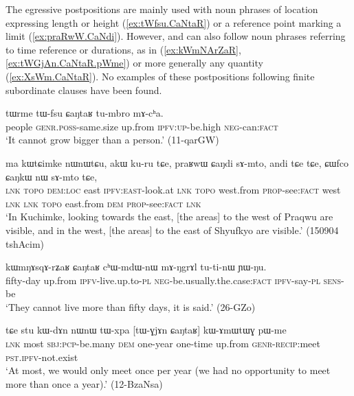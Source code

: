 The egressive postpositions are mainly used with noun phrases of location expressing length or height (\ref{ex:tWfsu.CaNtaR}) or a reference point marking a limit (\ref{ex:praRwW.CaNdi}). However,  and  can also follow noun phrases referring to time reference or durations, as in (\ref{ex:kWmNArZaR}, \ref{ex:tWGjAn.CaNtaR.pWme}) or more generally any quantity (\ref{ex:XsWm.CaNtaR}). No examples of these postpositions following finite subordinate clauses have been found.


\begin{exe}
\ex \label{ex:tWfsu.CaNtaR}
 \gll tɯrme tɯ-fsu ɕaŋtaʁ tu-mbro mɤ-cʰa. \\
people \textsc{genr}.\textsc{poss}-same.size up.from \textsc{ipfv}:\textsc{up}-be.high \textsc{neg}-can:\textsc{fact} \\
\glt `It cannot grow bigger than a person.' (11-qarGW)
\end{exe}
 
\begin{exe}
\ex \label{ex:praRwW.CaNdi}
 \gll ma kɯtɕimke nɯnɯtɕu, akɯ ku-ru tɕe, praʁwɯ ɕaŋdi sɤ-mto, 
andi tɕe tɕe, ɕɯfco ɕaŋkɯ nɯ sɤ-mto tɕe, \\
\textsc{lnk}  \textsc{topo} \textsc{dem}:\textsc{loc} east \textsc{ipfv}:\textsc{east}-look.at \textsc{lnk}  \textsc{topo} west.from \textsc{prop}-see:\textsc{fact} west \textsc{lnk} \textsc{lnk}  \textsc{topo} east.from \textsc{dem} \textsc{prop}-see:\textsc{fact} \textsc{lnk} \\
\glt `In Kuchimke, looking towards the east, [the areas] to the west of Praqwu are visible, and in the west, [the areas] to the east of Shyufkyo are visible.' (150904 tshAcim)
\end{exe}

\begin{exe}
\ex \label{ex:kWmNArZaR}
 \gll kɯmŋɤsqɤ-rʑaʁ ɕaŋtaʁ cʰɯ-mdɯ-nɯ mɤ-ŋgrɤl tu-ti-nɯ ɲɯ-ŋu.  \\
 fifty-day up.from \textsc{ipfv}-live.up.to-\textsc{pl} \textsc{neg}-be.usually.the.case:\textsc{fact} \textsc{ipfv}-say-\textsc{pl} \textsc{sens}-be \\
\glt `They cannot live more than fifty days, it is said.' (26-GZo) 
\end{exe}

\begin{exe}
\ex \label{ex:tWGjAn.CaNtaR.pWme}
 \gll tɕe stu kɯ-dɤn nɯnɯ tɯ-xpa [tɯ-ɣjɤn ɕaŋtaʁ] kɯ-ɤmɯtɯɣ pɯ-me \\
 \textsc{lnk} most \textsc{sbj}:\textsc{pcp}-be.many \textsc{dem} one-year one-time up.from \textsc{genr}-\textsc{recip}:meet \textsc{pst}.\textsc{ipfv}-not.exist \\
 \glt `At most, we would only meet once per year (we had no opportunity to meet more than once a year).' (12-BzaNsa)
 \end{exe}

